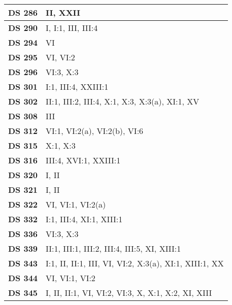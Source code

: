 \begin{xltabular}{\linewidth}{ l | X }
    \textbf {DS 286} & II, XXII \\ \hline

    \textbf {DS 290} & I, I:1, III, III:4 \\ \hline

    \textbf {DS 294} & VI \\ \hline

    \textbf {DS 295} & VI, VI:2 \\ \hline

    \textbf {DS 296} & VI:3, X:3 \\ \hline

    \textbf {DS 301} & I:1, III:4, XXIII:1 \\ \hline

    \textbf {DS 302} & II:1, III:2, III:4, X:1, X:3, X:3(a), XI:1, XV \\ \hline

    \textbf {DS 308} & III \\ \hline

    \textbf {DS 312} & VI:1, VI:2(a), VI:2(b), VI:6 \\ \hline

    \textbf {DS 315} & X:1, X:3 \\ \hline

    \textbf {DS 316} & III:4, XVI:1, XXIII:1 \\ \hline

    \textbf {DS 320} & I, II \\ \hline

    \textbf {DS 321} & I, II \\ \hline

    \textbf {DS 322} & VI, VI:1, VI:2(a) \\ \hline

    \textbf {DS 332} & I:1, III:4, XI:1, XIII:1 \\ \hline

    \textbf {DS 336} & VI:3, X:3 \\ \hline

    \textbf {DS 339} & II:1, III:1, III:2, III:4, III:5, XI, XIII:1 \\ \hline

    \textbf {DS 343} & I:1, II, II:1, III, VI, VI:2, X:3(a), XI:1, XIII:1, XX \\ \hline

    \textbf {DS 344} & VI, VI:1, VI:2 \\ \hline

    \textbf {DS 345} & I, II, II:1, VI, VI:2, VI:3, X, X:1, X:2, XI, XIII \\ \hline


\end{xltabular}

